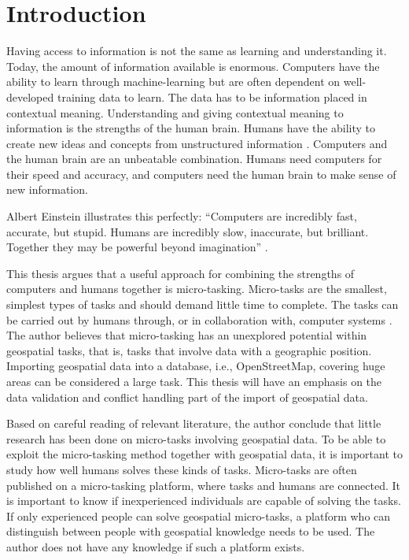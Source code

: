 \chapter{Introduction}
Having access to information is not the same as learning and understanding it. Today, the amount of information available is enormous. Computers have the ability to learn through machine-learning but are often dependent on well-developed training data to learn. The data has to be information placed in contextual meaning. Understanding and giving contextual meaning to information is the strengths of the human brain. Humans have the ability to create new ideas and concepts from unstructured information \citep{Ross2016}. Computers and the human brain are an unbeatable combination. Humans need computers for their speed and accuracy, and computers need the human brain to make sense of new information. 

Albert Einstein illustrates this perfectly: “Computers are incredibly fast, accurate, but stupid. Humans are incredibly slow, inaccurate, but brilliant. Together they may be powerful beyond imagination” \citep{Holzinger2013}. 

This thesis argues that a useful approach for combining the strengths of computers and humans together is micro-tasking. Micro-tasks are the smallest, simplest types of tasks and should demand little time to complete. The tasks can be carried out by humans through, or in collaboration with, computer systems \citep{Yang2016}. The author believes that micro-tasking has an unexplored potential within geospatial tasks, that is, tasks that involve data with a geographic position. %
Importing geospatial data into a database, i.e., OpenStreetMap, covering huge areas can be considered a large task. This thesis will have an emphasis on the data validation and conflict handling part of the import of geospatial data.

Based on careful reading of relevant literature, the author conclude that little research has been done on micro-tasks involving geospatial data. To be able to exploit the micro-tasking method together with geospatial data, it is important to study how well humans solves these kinds of tasks. Micro-tasks are often published on a micro-tasking platform, where tasks and humans are connected. It is important to know if inexperienced individuals are capable of solving the tasks. If only experienced people can solve geospatial micro-tasks, a platform who can distinguish between people with geospatial knowledge needs to be used. The author does not have any knowledge if such a platform exists. 

